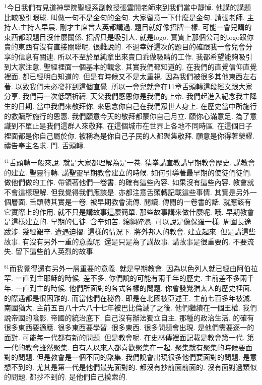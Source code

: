 \documentclass{book}
\begin{document}
$^{1}$今日我們有見道神學院聖經系副教授張雲開老師來到我們當中靜悼.
他講的講題比較吸引眼球.
叫做一句不是金句的金句.
大家留意一下什麼是金句.
請張老師.
主持人:主持人早晨.
剛才主席曾大英都講過.
題目就好像招牌一樣.
可能一會兒講的東西都跟題目沒什麼關係.
招牌只是吸引人.
就是logo.
實質上那個公司的logo跟你賣的東西有沒有直接關聯呢.
很難說的.
不過幸好這次的題目的確跟我一會兒會分享的信息有關連.
所以不至於單純拿出來賣口乖做吸睛的工作.
我都希望能夠吸引到大家注意.
聖經裡面一個基本的觀念.
其實我們都知道的.
在我們的直覺信仰直覺裡面.
都已經明白知道的.
但是有時候又不是太重視.
因為我們被很多其他東西左右著.
以致我們未必發揮到這個直覺.
所以一會兒就會在11章舌頭轉這段經文跟大家分享.
我們再一次低頭祈禱.
天父我們感恩你是我們的上帝.
我們起進入紀念我主降生的日期.
當中我們來敬拜你.
來思念你自己在我們眾世人身上.
在歷史當中所施行的救贖所施行的恩惠.
我們願意今天的敬拜都蒙你自己月立.
願你心滿意足.
為了意識到不單止是我們這群人來敬拜.
在這個城市在世界上各地不同時區.
在這個日子裡面都是你自己屬於你.
被稱為是你自己子民的人都聚集敬拜.
願意是你得著榮耀.
禱告奉主名求.
門.
舌頭轉.

$^{41}$舌頭轉一般來說.
就是大家都理解為是一卷.
猜拳講宣教講早期教會歷史.
講教會的建立.
聖靈行轉.
講聖靈早期教會建立的時候.
如何引導著最早期的使徒們徒們.
做他們做的工作.
帶領著他們一卷書.
的確有這些內容.
如果沒有這些內容.
教會就不會這樣理解.
但我覺得我們應該是.
亦都注意舌頭轉記載這些事情.
其實是另外一個層面.
舌頭轉其實是一卷.
被早期教會流傳.
閱讀.
傳閱的一卷書的話.
就應該有它實際上的作用.
就不只是講故事這麼簡單.
那些故事講來做什麼呢.
哦.
早期教會是這樣建立的.
早期的信徒.
含辛如苦.
綿綱碎濕.
可以說是像保羅一樣.
周圍長途跋涉.
幾經艱辛.
遭遇迫摺.
這樣的情況下.
將外邦人的教會.
建立起來.
但是講這些故事.
有沒有另外一重的意義呢.
還是只是為了講故事.
講故事是很重要的.
不要流失.
留下這些前人英烈的故事.

$^{81}$而我覺得還有另外一層重要的意義.
就是早期教會.
因為以色列人就已經由阿伯拉罕.
一直到主耶穌的時候.
差不多.
你們說的可能有兩千年的歷史.
主前差不多兩千年.
一直到主的時候.
他們所面對的各式各樣的問題.
你會發覺猶太人的歷史裡面.
的際遇都是很困難的.
而當他們在秘魯.
即是在北國被亞述王.
主前七百多年被滅.
南國猶大.
主前五百八十六八十七年被巴比倫滅了之後.
他們繼續在一個王權.
我們說帝國的陰影.
帝國的統治底下.
自己沒有辦法獨立自主.
那種的政治生活.
的確有很多東西要適應.
很多東西要學習.
很多東西.
很多問題會出現.
是他們需要逐一的面對.
可能每一代都有新的問題.
但是教會呢.
在史林傳裡面記載是教會第一代.
第一代的教會雖然聚集.
自有人以來人都喜歡聚集在一起.
聚集就有聚集的時候要面對的問題.
但是教會是一個不同的聚集.
我們說會出現很多他們要面對的問題.
是意想不到的.
尤其是第一代是他們最先面對的.
都沒有抄前面前面的.
沒有面對過類似的問題.
都抄不到的.
是他們自己摸索的.
\end{document}
